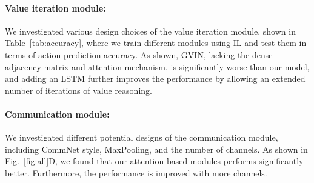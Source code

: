 
\vspace{-0.1in}
\paragraph{Value iteration module:}
We investigated various design choices of the value iteration module, shown in
Table~\ref{tab:accuracy}, where we train different modules using IL and test them in
terms of action prediction accuracy. As shown, GVIN, lacking the dense adjacency matrix and
attention mechanism, is significantly worse than our model, and adding an LSTM further improves the
performance by allowing an extended number of iterations of value reasoning.

\vspace{-0.1in}
\paragraph{Communication module:}
We investigated different potential designs of the communication module,
including CommNet style, MaxPooling, and the number of channels. As shown in Fig.~\ref{fig:all}D, we found that our attention based
modules performs significantly better. Furthermore, the performance is improved with more channels.



